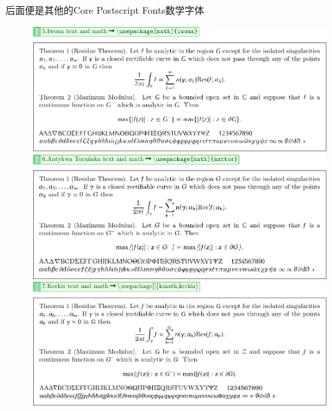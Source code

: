 \documentclass[12pt]{article}
\begin{document}
\clearpage
{}\; 后面便是其他的Core Postscript Fonts数学字体
\begin{figure}[!htb]
    \centering
    \includegraphics[width=.95\linewidth]{./MathFontVision/Iwona-Text-and-Math.pdf}
    
    \vspace*{2em}
    \includegraphics[width=.95\linewidth]{./MathFontVision/Antykwa-Torunska-Text-and-Math.pdf}

    \vspace*{2em}
    \includegraphics[width=.95\linewidth]{./MathFontVision/Kmath-Kerkis-Text-and-Math.pdf}
\end{figure}
\end{document}
